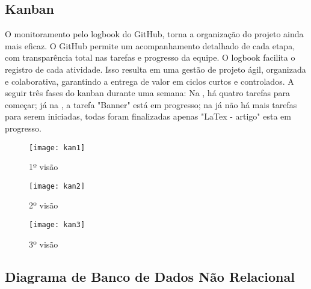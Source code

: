


\subsection*{Kanban}

O monitoramento pelo logbook do GitHub, torna a organização do projeto ainda mais eficaz. O GitHub permite um acompanhamento detalhado de cada etapa, com transparência total nas tarefas e progresso da equipe. O logbook facilita o registro de cada atividade. Isso resulta em uma gestão de projeto ágil, organizada e colaborativa, garantindo a entrega de valor em ciclos curtos e controlados. A seguir três fases do kanban durante uma semana: Na , há quatro tarefas para começar; já na , a tarefa "Banner" está em progresso; na  já não há mais tarefas para serem iniciadas, todas foram finalizadas apenas "LaTex - artigo" esta em progresso.

\begin{figure}[H]
    \centering
    \caption{1º visão}%
    \label{fig:1}
    \texttt{[image: kan1]}
    \end{figure}


    \begin{figure}[H]
        \centering
        \caption{2º visão}%
        \label{fig:2}
        \texttt{[image: kan2]}
        \end{figure}


        \begin{figure}[H]
            \centering
            \caption{3º visão}%
            \label{fig:3}
            \texttt{[image: kan3]}
            \end{figure}
            


\subsection*{Diagrama de Banco de Dados Não Relacional}

